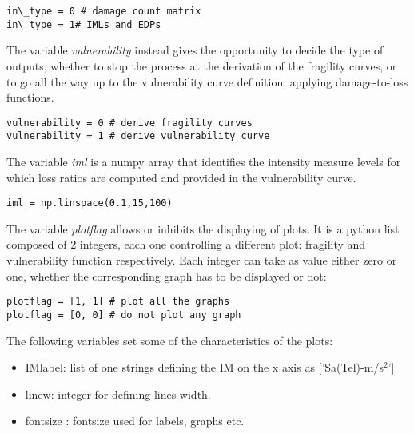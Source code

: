 \begin{Verbatim}[frame=single, commandchars=\\\{\}, samepage=true]
in\_type = 0 # damage count matrix 
in\_type = 1# IMLs and EDPs 
\end{Verbatim}

The variable \textit{vulnerability} instead gives the opportunity to decide the type of outputs, whether to stop the process at the derivation of the fragility curves, or to go all the way up to the vulnerability curve definition, applying damage-to-loss functions.

\begin{Verbatim}[frame=single, commandchars=\\\{\}, samepage=true]
vulnerability = 0 # derive fragility curves 
vulnerability = 1 # derive vulnerability curve
\end{Verbatim}

The variable \textit{iml} is a numpy array that identifies the intensity measure levels for which loss ratios are computed and provided in the vulnerability curve.

\begin{Verbatim}[frame=single, commandchars=\\\{\}, samepage=true]
iml = np.linspace(0.1,15,100)
\end{Verbatim}

The variable \textit{plotflag} allows or inhibits the displaying of plots. It is a python list composed of 2 integers, each one controlling a different plot: fragility and vulnerability function respectively. Each integer can take as value either zero or one, whether the corresponding graph has to be displayed or not:

\begin{Verbatim}[frame=single, commandchars=\\\{\}, samepage=true]
plotflag = [1, 1] # plot all the graphs
plotflag = [0, 0] # do not plot any graph
\end{Verbatim}

The following variables set some of the characteristics of the plots:
\begin{itemize}
\item IMlabel: list of one strings defining the IM on the x axis as ['Sa(Tel)-m/s$^{2}$']
\item linew: integer for defining lines width.
\item fontsize : fontsize used for labels, graphs etc.
\end{itemize}

